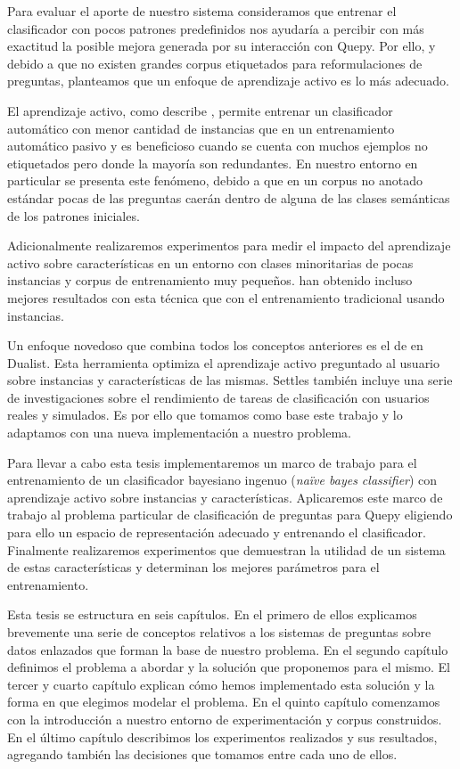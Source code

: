Para evaluar el aporte de nuestro sistema consideramos que entrenar el clasificador con pocos patrones predefinidos nos ayudaría a percibir con más exactitud la posible mejora generada por su interacción con Quepy. Por ello, y debido a que no existen grandes corpus etiquetados para reformulaciones de preguntas, planteamos que un enfoque de aprendizaje activo es lo más adecuado.

El aprendizaje activo, como describe \citet{settles_active_learning_survey}, permite entrenar un clasificador automático con menor cantidad de instancias que en un entrenamiento automático pasivo y es beneficioso cuando se cuenta con muchos ejemplos no etiquetados pero donde la mayoría son redundantes. En nuestro entorno en particular se presenta este fenómeno, debido a que en un corpus no anotado estándar pocas de las preguntas caerán dentro de alguna de las clases semánticas de los patrones iniciales.

Adicionalmente realizaremos experimentos para medir el impacto del aprendizaje activo sobre características en un entorno con clases minoritarias de pocas instancias y corpus de entrenamiento muy pequeños. \citet{settles-al-features} han obtenido incluso mejores resultados con esta técnica que con el entrenamiento tradicional usando instancias.

Un enfoque novedoso que combina todos los conceptos anteriores es el de \citet{dualist} en Dualist. Esta herramienta optimiza el aprendizaje activo preguntado al usuario sobre instancias y características de las mismas. Settles también incluye una serie de investigaciones sobre el rendimiento de tareas de clasificación con usuarios reales y simulados. Es por ello que tomamos como base este trabajo y lo adaptamos con una nueva implementación a nuestro problema.

Para llevar a cabo esta tesis implementaremos un marco de trabajo para el entrenamiento de un clasificador bayesiano ingenuo (\textit{naïve bayes classifier}) con aprendizaje activo sobre instancias y características. Aplicaremos este marco de trabajo al problema particular de clasificación de preguntas para Quepy eligiendo para ello un espacio de representación adecuado y entrenando el clasificador. Finalmente realizaremos experimentos que demuestran la utilidad de un sistema de estas características y determinan los mejores parámetros para el entrenamiento.

Esta tesis se estructura en seis capítulos. En el primero de ellos explicamos brevemente una serie de conceptos relativos a los sistemas de preguntas sobre datos enlazados que forman la base de nuestro problema. En el segundo capítulo definimos el problema a abordar y la solución que proponemos para el mismo. El tercer y cuarto capítulo explican cómo hemos implementado esta solución y la forma en que elegimos modelar el problema. En el quinto capítulo comenzamos con la introducción a nuestro entorno de experimentación y corpus construidos. En el último capítulo describimos los experimentos realizados y sus resultados, agregando también las decisiones que tomamos entre cada uno de ellos.